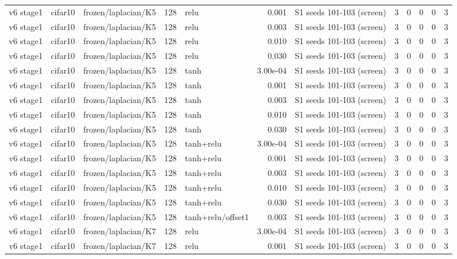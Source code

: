 \begin{table}[htbp]
{\begin{tabular}{@{}lllrlrlrrrrr@{}}
v6 stage1 & cifar10 & frozen/laplacian/K5 & 128 & relu & 0.001 & S1 seeds 101-103 (screen) & 3 & 0 & 0 & 0 & 3 \\
v6 stage1 & cifar10 & frozen/laplacian/K5 & 128 & relu & 0.003 & S1 seeds 101-103 (screen) & 3 & 0 & 0 & 0 & 3 \\
v6 stage1 & cifar10 & frozen/laplacian/K5 & 128 & relu & 0.010 & S1 seeds 101-103 (screen) & 3 & 0 & 0 & 0 & 3 \\
v6 stage1 & cifar10 & frozen/laplacian/K5 & 128 & relu & 0.030 & S1 seeds 101-103 (screen) & 3 & 0 & 0 & 0 & 3 \\
v6 stage1 & cifar10 & frozen/laplacian/K5 & 128 & tanh & 3.00e-04 & S1 seeds 101-103 (screen) & 3 & 0 & 0 & 0 & 3 \\
v6 stage1 & cifar10 & frozen/laplacian/K5 & 128 & tanh & 0.001 & S1 seeds 101-103 (screen) & 3 & 0 & 0 & 0 & 3 \\
v6 stage1 & cifar10 & frozen/laplacian/K5 & 128 & tanh & 0.003 & S1 seeds 101-103 (screen) & 3 & 0 & 0 & 0 & 3 \\
v6 stage1 & cifar10 & frozen/laplacian/K5 & 128 & tanh & 0.010 & S1 seeds 101-103 (screen) & 3 & 0 & 0 & 0 & 3 \\
v6 stage1 & cifar10 & frozen/laplacian/K5 & 128 & tanh & 0.030 & S1 seeds 101-103 (screen) & 3 & 0 & 0 & 0 & 3 \\
v6 stage1 & cifar10 & frozen/laplacian/K5 & 128 & tanh+relu & 3.00e-04 & S1 seeds 101-103 (screen) & 3 & 0 & 0 & 0 & 3 \\
v6 stage1 & cifar10 & frozen/laplacian/K5 & 128 & tanh+relu & 0.001 & S1 seeds 101-103 (screen) & 3 & 0 & 0 & 0 & 3 \\
v6 stage1 & cifar10 & frozen/laplacian/K5 & 128 & tanh+relu & 0.003 & S1 seeds 101-103 (screen) & 3 & 0 & 0 & 0 & 3 \\
v6 stage1 & cifar10 & frozen/laplacian/K5 & 128 & tanh+relu & 0.010 & S1 seeds 101-103 (screen) & 3 & 0 & 0 & 0 & 3 \\
v6 stage1 & cifar10 & frozen/laplacian/K5 & 128 & tanh+relu & 0.030 & S1 seeds 101-103 (screen) & 3 & 0 & 0 & 0 & 3 \\
v6 stage1 & cifar10 & frozen/laplacian/K5 & 128 & tanh+relu/offset1 & 0.003 & S1 seeds 101-103 (screen) & 3 & 0 & 0 & 0 & 3 \\
v6 stage1 & cifar10 & frozen/laplacian/K7 & 128 & relu & 3.00e-04 & S1 seeds 101-103 (screen) & 3 & 0 & 0 & 0 & 3 \\
v6 stage1 & cifar10 & frozen/laplacian/K7 & 128 & relu & 0.001 & S1 seeds 101-103 (screen) & 3 & 0 & 0 & 0 & 3 \\

\end{tabular}}
\end{table}
